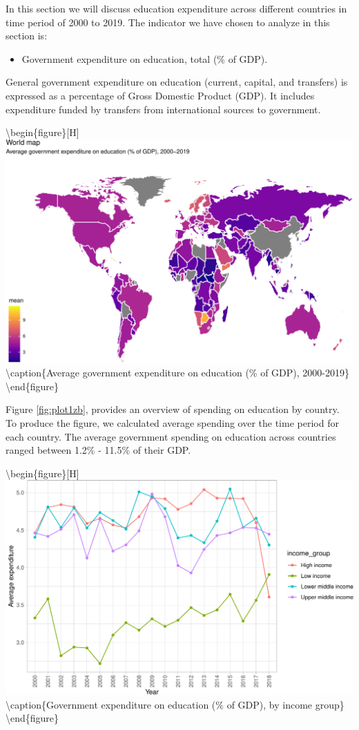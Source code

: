 \documentclass[11pt,a4paper,]{article}
\providecommand{\tightlist}{%
  \setlength{\itemsep}{0pt}\setlength{\parskip}{0pt}}
\begin{document}
In this section we will discuss education expenditure across different countries in time period of 2000 to 2019. The indicator we have chosen to analyze in this section is:

\begin{itemize}
\tightlist
\item
  Government expenditure on education, total (\% of GDP).
\end{itemize}

General government expenditure on education (current, capital, and transfers) is expressed as a percentage of Gross Domestic Product (GDP). It includes expenditure funded by transfers from international sources to government.

\textbackslash begin\{figure\}{[}H{]}
\includegraphics{report_files/figure-latex/plot1zb-1} \textbackslash caption\{Average government expenditure on education (\% of GDP), 2000-2019\}\label{fig:plot1zb}
\textbackslash end\{figure\}

Figure \ref{fig:plot1zb}, provides an overview of spending on education by country. To produce the figure, we calculated average spending over the time period for each country. The average government spending on education across countries ranged between 1.2\% - 11.5\% of their GDP.

\textbackslash begin\{figure\}{[}H{]}
\includegraphics{report_files/figure-latex/plot2-zb-1} \textbackslash caption\{Government expenditure on education (\% of GDP), by income group\}\label{fig:plot2-zb}
\textbackslash end\{figure\}
\end{document}
